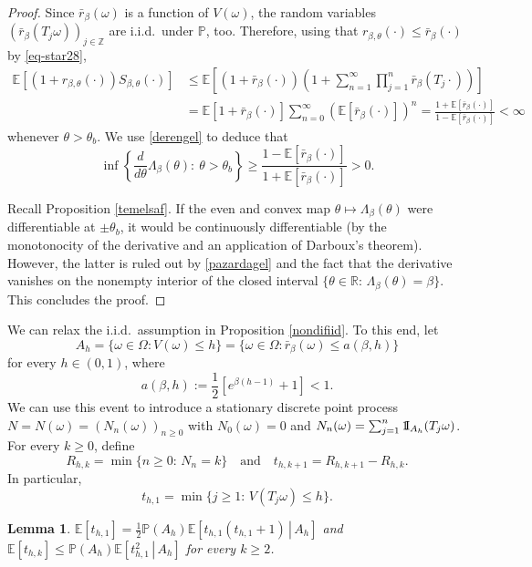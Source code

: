 \documentclass[a4paper]{amsart}
\numberwithin{equation}{section}
\theoremstyle{plain}
\newtheorem{lemma}[theorem]{\sc Lemma}
\theoremstyle{remark}
\begin{document}
\begin{proof}
	Since $\bar r_\beta(\omega)$ is a function of $V(\omega)$, the random variables $\left(\bar r_\beta(T_j\omega)\right)_{j\in\mathbb{Z}}$ are i.i.d.\ under $\mathbb{P}$, too. Therefore, {}{using that
	  $r_{\beta,\theta}(\cdot)\leq \bar r_\beta(\cdot)$ by \eqref{eq-star28},}
	\begin{align*}
	\mathbb{E}[(1 + r_{\beta,\theta}(\cdot))S_{\beta,\theta}(\cdot)] &\le \mathbb{E}\left[(1 + \bar r_\beta(\cdot))\left(1 + \sum_{n=1}^\infty\prod_{j=1}^n\bar r_\beta(T_j\cdot)\right)\right]\\
	&= \mathbb{E}[1 + \bar r_\beta(\cdot)]\sum_{n=0}^\infty\left(\mathbb{E}[\bar r_\beta(\cdot)]\right)^n = \frac{1 + \mathbb{E}[\bar r_\beta(\cdot)]}{1 - \mathbb{E}[\bar r_\beta(\cdot)]} < \infty
	\end{align*}
	whenever $\theta>\theta_b$. We use \eqref{derengel} to deduce that
	\begin{equation}\label{pazardagel}
	\inf\left\{\frac{d}{d\theta}\Lambda_\beta(\theta):\ \theta>\theta_b\right\} \ge \frac{1 - \mathbb{E}[\bar r_\beta(\cdot)]}{1 + \mathbb{E}[\bar r_\beta(\cdot)]} > 0.
	\end{equation}
	
	Recall Proposition \ref{temelsaf}. If the even and convex map $\theta\mapsto\Lambda_\beta(\theta)$ were differentiable at $\pm\theta_b$, it would be continuously differentiable (by the monotonocity of the derivative and an application of Darboux's theorem). However, the latter is ruled out by \eqref{pazardagel} and the fact that the derivative vanishes on the nonempty interior of the closed interval $\{\theta\in\mathbb{R}:\,\Lambda_\beta(\theta)=\beta\}$. This concludes the proof.
\end{proof}

We can relax the i.i.d.\ assumption in Proposition \ref{nondifiid}. To this end, let $$A_h = \{\omega\in\Omega: V(\omega)\le h\} = \{\omega\in\Omega: \bar r_\beta(\omega)\le a(\beta,h)\}$$ for every $h\in(0,1)$, where $$a(\beta,h) := \frac1{2}\left[e^{\beta (h - 1)} + 1\right] < 1.$$
We can use this event to introduce a stationary discrete point process $N = N(\omega) = (N_n(\omega))_{n\ge0}$ with $N_0(\omega) = 0$ and $N_n(\omega) = \sum_{j=1}^n{{{\rm 1\mkern-1.5mu}\!{\rm I}}}_{A_h}(T_j\omega)$.
For every $k\ge0$, define $$R_{h,k} = \min\{n\ge0:\,N_n = k\}\quad\text{and}\quad t_{h,k+1} = R_{h,k+1} - R_{h,k}.$$
In particular,
$$t_{h,1} = \min\{j\ge1:\,V(T_j\omega) \le h\}.$$

\begin{lemma}\label{yenlek}
	$\mathbb{E}[t_{h,1}] = \frac1{2}\mathbb{P}(A_h)\mathbb{E}\left[\left.t_{h,1}(t_{h,1} + 1)\,\right|\,A_h\right]$ and $\mathbb{E}[t_{h,k}] \le \mathbb{P}(A_h)\mathbb{E}\left[\left.t_{h,1}^2\,\right|\,A_h\right]$ for every $k\ge2$.
\end{lemma}
\end{document}
